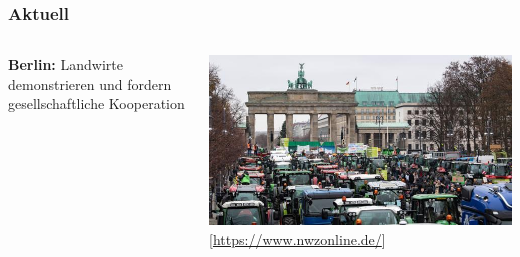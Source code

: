 \documentclass{beamer}
\begin{document}

\begin{frame}
\frametitle{Aktuell}
\begin{columns}[c] %

\textbf{Berlin:}
Landwirte demonstrieren und fordern gesellschaftliche Kooperation

\includegraphics[scale=0.22]{demo.jpg}
\tiny [\url{https://www.nwzonline.de/}]
\end{columns}
\end{frame}

\end{document}
